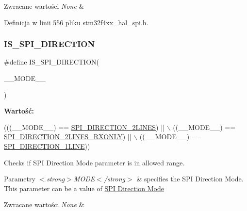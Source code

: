 \begin{DoxyRetVals}{Zwracane wartości}
{\em None} & \\
\hline
\end{DoxyRetVals}


Definicja w linii 556 pliku stm32f4xx\+\_\+hal\+\_\+spi.\+h.

\mbox{\label{group___s_p_i___private___macros_ga6c66285d42fc3baf5ecaceadb54ee42a}} 
\subsubsection{\texorpdfstring{I\+S\+\_\+\+S\+P\+I\+\_\+\+D\+I\+R\+E\+C\+T\+I\+ON}{IS\_SPI\_DIRECTION}}
{\footnotesize\ttfamily \#define I\+S\+\_\+\+S\+P\+I\+\_\+\+D\+I\+R\+E\+C\+T\+I\+ON(\begin{DoxyParamCaption}\item[{}]{\+\_\+\+\_\+\+M\+O\+D\+E\+\_\+\+\_\+ }\end{DoxyParamCaption})}

{\bfseries Wartość\+:}
\begin{DoxyCode}
(((\_\_MODE\_\_) == \hyperlink{group___s_p_i___direction_gaa7cb7f4bf4eebbf91bcfaeb17ebba7f3}{SPI\_DIRECTION\_2LINES})        || \(\backslash\)
                                    ((\_\_MODE\_\_) == \hyperlink{group___s_p_i___direction_ga444826cf94667f75503f54704b2fb391}{SPI\_DIRECTION\_2LINES\_RXONLY}) 
      || \(\backslash\)
                                    ((\_\_MODE\_\_) == \hyperlink{group___s_p_i___direction_gab0f684caf5f1d6ac1e73d90a4778ab93}{SPI\_DIRECTION\_1LINE}))
\end{DoxyCode}


Checks if S\+PI Direction Mode parameter is in allowed range. 


\begin{DoxyParams}{Parametry}
{\em $<$strong$>$\+M\+O\+D\+E$<$/strong$>$} & specifies the S\+PI Direction Mode. This parameter can be a value of \hyperlink{group___s_p_i___direction}{S\+PI Direction Mode} \\
\hline
\end{DoxyParams}

\begin{DoxyRetVals}{Zwracane wartości}
{\em None} & \\
\hline
\end{DoxyRetVals}


